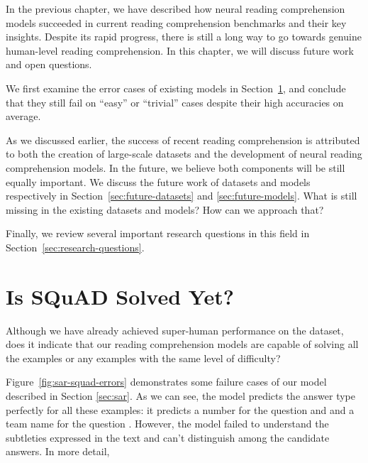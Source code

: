 
In the previous chapter, we have described how neural reading comprehension models succeeded in current reading comprehension benchmarks and their key insights. Despite its rapid progress, there is still a long way to go towards genuine human-level reading comprehension. In this chapter, we will discuss future work and open questions.

We first examine the error cases of existing models in Section~\ref{sec:squad-errors}, and conclude that they still fail on ``easy'' or ``trivial'' cases despite their high accuracies on average.

As we discussed earlier, the success of recent reading comprehension is attributed to both the creation of large-scale datasets and the development of neural reading comprehension models. In the future, we believe both components will be still equally important. We  discuss the future work of datasets and models respectively in Section~\ref{sec:future-datasets} and \ref{sec:future-models}. What is still missing in the existing datasets and models? How can we approach that?

Finally, we review several important research questions in this field in Section~\ref{sec:research-questions}.

\section{Is SQuAD Solved Yet?}
\label{sec:squad-errors}

Although we have already achieved super-human performance on the  dataset, does it indicate that our reading comprehension models are capable of solving all the  examples or any examples with the same level of difficulty?

Figure~\ref{fig:sar-squad-errors} demonstrates some failure cases of our  model described in Section \ref{sec:sar}. As we can see, the model predicts the answer type perfectly for all these examples: it predicts a number for the question  and  and a team name for the question . However, the model failed to understand the subtleties expressed in the text and can't distinguish among the candidate answers. In more detail,


